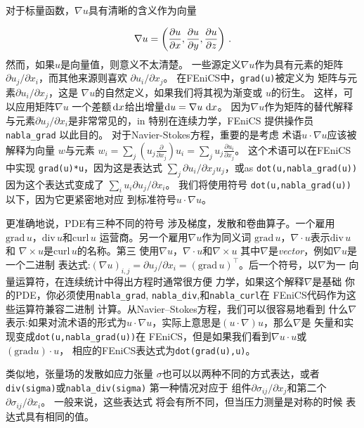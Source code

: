 
\begin{notice}%
对于标量函数，$\nabla u$具有清晰的含义作为向量

\[ \nabla u =\left(\frac{\partial u}{\partial x}, \frac{\partial u}{\partial y},
\frac{\partial u}{\partial z}\right)\tp\]
然而，如果$u$是向量值，则意义不太清楚。
一些源定义$\nabla u$作为具有元素的矩阵
$\partial u_j / \partial x_i$，而其他来源则喜欢
$\partial u_i / \partial x_j$。 在FEniCS中，\texttt{grad(u)}被定义为
矩阵与元素$\partial u_i / \partial x_j$，这是
$\nabla u$的自然定义，如果我们将其视为渐变或
$u$的衍生。 这样，可以应用矩阵$\nabla u$
一个差额$\dx$给出增量$\mathrm{d}u = \nabla u \,
\dx$。 因为$\nabla u$作为矩阵的替代解释
与元素$\partial u_j / \partial x_i$是非常常见的，in
特别在连续力学，FEniCS
提供操作员\verb!nabla_grad! 以此目的。
对于Navier-Stokes方程，重要的是考虑
术语$u \cdot \nabla u $应该被解释为向量
$w$与元素
$w_i = \sum_j \left(u_j \frac{\partial}{\partial x_j}\right) u_i
= \sum_j u_j \frac{\partial u_i}{\partial x_j}$。
这个术语可以在FEniCS中实现
\texttt{grad(u)*u}，因为这是表达式
$\sum_j \partial u_i / \partial x_j u_j$，或as
\verb!dot(u,nabla_grad(u))! 因为这个表达式变成了
$\sum_i u_i \partial u_j / \partial x_i$。 我们将使用符号
\verb!dot(u,nabla_grad(u))! 以下，因为它更紧密地对应
到标准符号$u \cdot \nabla u$。

更准确地说，PDE有三种不同的符号
涉及梯度，发散和卷曲算子。一个雇用
$\mathrm{grad}\, u$，$\mathrm{div}\, u$和$\mathrm{curl}\, u$
运营商。另一个雇用$\nabla u$作为同义词
$\mathrm{grad}\, u$，$\nabla\cdot u$表示$\mathrm{div}\, u$和
$\nabla\times u$是$\mathrm{curl}\, u$的名称。第三
使用$\nabla u$，$\nabla\cdot u$和$\nabla\times u$
其中$\nabla$是\emph{vector}，例如$\nabla u$是一个二进制
表达式:$(\nabla u)_{i,j} = \partial u_j/\partial x_i =
(\mathrm{grad}\,u)^{\top}$。后一个符号，以$\nabla$为一
向量运算符，在连续统计中得出方程时通常很方便
力学，如果这个解释$\nabla$是基础
你的PDE，你必须使用\verb!nabla_grad!, \verb!nabla_div!,和\verb!nabla_curl!在
FEniCS代码作为这些运算符兼容二进制
计算。从Navier--Stokes方程，我们可以很容易地看到
什么$\nabla$表示:如果对流术语的形式为$u \cdot
\nabla u$，实际上意思是$(u \cdot\nabla)u$，那么$\nabla$是
矢量和实现变成\verb!dot(u,nabla_grad(u))!在
FEniCS，但是如果我们看到$\nabla u\cdot u$或$(\mathrm{grad}u)\cdot u$，
相应的FEniCS表达式为\texttt{dot(grad(u),u)}。

类似地，张量场的发散如应力张量
$\sigma$也可以以两种不同的方式表达，或者
\texttt{div(sigma)}或\verb!nabla_div(sigma)! 第一种情况对应于
组件$\partial \sigma_ {ij}/{\partial x_j}$和第二个
$\partial \sigma_ {ij}/{\partial x_i}$。 一般来说，这些表达式
将会有所不同，但当压力测量是对称的时候
表达式具有相同的值。
\end{notice}

